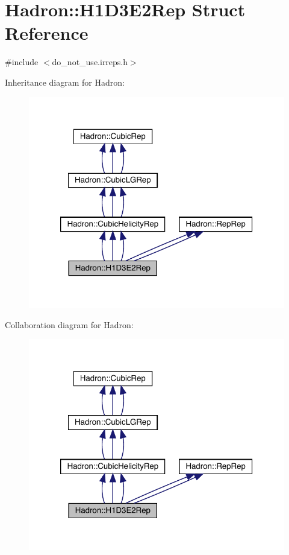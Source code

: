 \hypertarget{structHadron_1_1H1D3E2Rep}{}\section{Hadron\+:\+:H1\+D3\+E2\+Rep Struct Reference}
\label{structHadron_1_1H1D3E2Rep}


{\ttfamily \#include $<$do\+\_\+not\+\_\+use.\+irreps.\+h$>$}



Inheritance diagram for Hadron\+:
\nopagebreak
\begin{figure}[H]
\begin{center}
\leavevmode
\includegraphics[width=320pt]{d2/da1/structHadron_1_1H1D3E2Rep__inherit__graph}
\end{center}
\end{figure}


Collaboration diagram for Hadron\+:
\nopagebreak
\begin{figure}[H]
\begin{center}
\leavevmode
\includegraphics[width=320pt]{d2/d4c/structHadron_1_1H1D3E2Rep__coll__graph}
\end{center}
\end{figure}
